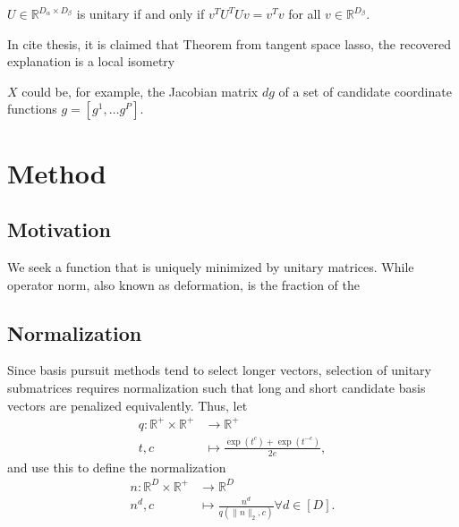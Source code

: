\documentclass[a4paper,11pt]{article}
\begin{document}
\begin{proposition}
\label{prop:unitary_spectrum}
$U \in \mathbb{R}^{D_\alpha \times D_\beta}$ is unitary if and only if $v^T  U^T U v = v^T v$ for all $v \in \mathbb R^{D_\beta}$.
\end{proposition}

In cite thesis, it is claimed that Theorem from tangent space lasso, the recovered explanation is a local isometry

$X$ could be, for example, the Jacobian matrix $d g$ of a set of candidate coordinate functions $g = [g^1, \dotsc g^P]$.


\section{Method}


\subsection{Motivation}

We seek a function that is uniquely minimized by unitary matrices.
While operator norm, also known as deformation, is the fraction of the 
\subsection{Normalization}

Since basis pursuit methods tend to select longer vectors, selection of unitary submatrices requires normalization such that long and short candidate basis vectors are penalized equivalently.
Thus, let
\begin{align}
\label{eq:normalization}
q: \mathbb R^+ \times \mathbb R^+  &\to \mathbb R^+ \\
t , c &\mapsto \frac{\exp(t^c) + \exp(t^{-c})}{2e},
\end{align}
and use this to define the normalization 
\begin{align}
n: \mathbb R^D \times \mathbb R^+ &\to \mathbb R^D \\
n^d , c &\mapsto \frac{n^d}{q(\|n\|_{2},c) } \forall d \in [D].
\end{align}
\end{document}
